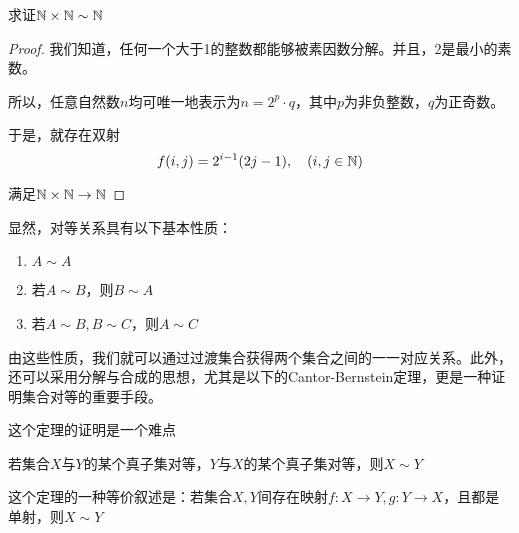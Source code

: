 \begin{example}
    求证$\mathbb{N} \times \mathbb{N} \sim \mathbb{N}$
\end{example}

\begin{proof}
    我们知道，任何一个大于1的整数都能够被素因数分解。并且，2是最小的素数。

    所以，任意自然数$n$均可唯一地表示为$n=2^p \cdot q$，其中$p$为非负整数，$q$为正奇数。

    于是，就存在双射
    \[f(i,j) = 2^{i-1}(2j-1),\quad (i,j\in \mathbb{N}) \]
    
    满足$\mathbb{N} \times \mathbb{N} \rightarrow \mathbb{N}$

\end{proof}

显然，对等关系具有以下基本性质：

\begin{enumerate}
    \item $A\sim A$
    \item 若$A\sim B$，则$B\sim A$
    \item 若$A\sim B,B\sim C$，则$A\sim C$
\end{enumerate}

由这些性质，我们就可以通过过渡集合获得两个集合之间的一一对应关系。此外，还可以采用分解与合成的思想，尤其是以下的Cantor-Bernstein定理，更是一种证明集合对等的重要手段。

\begin{remark}
    这个定理的证明是一个难点
\end{remark}

\begin{theorem}
    若集合$X$与$Y$的某个真子集对等，$Y$与$X$的某个真子集对等，则$X\sim Y$

    这个定理的一种等价叙述是：若集合$X,Y$间存在映射$f:X\rightarrow Y,g:Y\rightarrow X$，且都是单射，则$X\sim Y$
\end{theorem}

